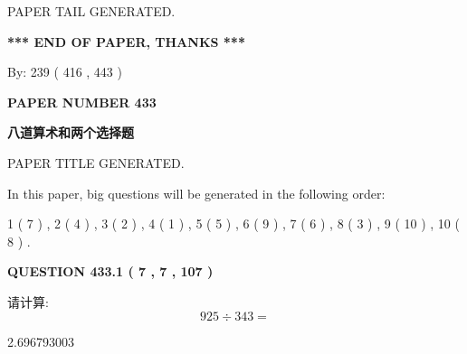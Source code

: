 \documentclass{ctexart}
\begin{document}
   
   
\vspace{2.0in} PAPER TAIL GENERATED.
   
   
   
   
\vspace{1.0in} 
{\textbf{\large{ *** END OF PAPER, THANKS *** }}} 
   
   
\hspace{1.0in} By: 
 239 ( 416 ,  443 )
   
   
   
   
\newpage 
\setcounter{page}{ 
   433001 } 
   
   
   
   
 {\textbf{ \Large{ PAPER NUMBER  433  }}}
   
   
\vspace{0.2in}
   
   
   
   
   
   
   
   
 \vspace{0.2in}
{\LARGE {\textbf{ 八道算术和两个选择题}}}
   
   
 PAPER TITLE GENERATED.
   
   
   
\vspace{0.2in}
   
In this paper, big questions will be generated in the following order: 
   
   
   1 ( 7 )
 ,
   2 ( 4 )
 ,
   3 ( 2 )
 ,
   4 ( 1 )
 ,
   5 ( 5 )
 ,
   6 ( 9 )
 ,
   7 ( 6 )
 ,
   8 ( 3 )
 ,
   9 ( 10 )
 ,
   10 ( 8 )
 .
  
\vspace{0.2in}
  
{\textbf{\Large{QUESTION
433.1 
 ( 7 , 7 , 107 )
}}}
  
  
 
请计算:
\begin{equation}
925  \div    %
343 = \nonumber
\end{equation}
 
 
 
\noindent{}
 
 

2.696793003
 
 
\noindent{}
 
\end{document}
